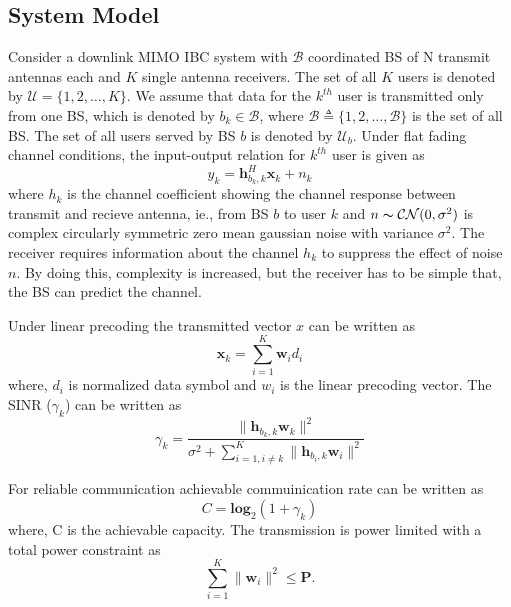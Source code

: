 \documentclass[a4paper, 12pt,titlepage]{dithesis} %
\newcommand{\me}[1]{\( #1 \)}
\begin{document}

\subsection{System Model}

Consider a downlink \ac{MIMO} \ac{IBC} system with \me{\mathcal {B}} coordinated \ac{BS} of N transmit antennas each and \me{K} single antenna receivers. The set of all \me{K} users is denoted by \me{\mathcal{U} = \{1,2,\dotsc, K\}}. We assume that data for the \me{k^{th}} user is transmitted only from one BS, which is denoted by \me{b_k \in \mathcal{B}}, where \me{\mathcal{B} \triangleq \{1,2,\dotsc, \mathcal{B}\}} is the set of all \ac{BS}. The set of all users served by BS \me{b} is denoted by \me{\mathcal{U}_b}. Under flat fading channel conditions, the input-output relation for \me{k^{th}} user is given as
\begin{equation}
y_k = \mathbf{h}_{b_k,k}^H \mathbf{x}_k  + {n}_k
\label{precoder1_eqn}
\end{equation}
where \me{h_k} is the channel coefficient showing the channel response between transmit and recieve antenna, ie., from \ac{BS} \me{b} to user \me{k} and \me{{n} \thicksim \mathcal{CN}(0,\sigma^{2})} is complex circularly symmetric zero mean gaussian noise with variance  \me{\sigma^2}. The receiver requires information about the channel \me{h_k} to suppress the effect of noise \me{n}. By doing this, complexity is increased, but the receiver has to be simple that, the \ac{BS} can predict the channel.

Under linear precoding the transmitted vector \me{x} can be written as
\begin{equation}
\mathbf{x}_k = \sum^K_{i=1} \mathbf{w}_i d_i
\label{precoder2_eqn}
\end{equation}
where, \me{d_i} is normalized data symbol and \me{w_i} is the linear precoding vector. The \ac{SINR} (\me{\gamma_k}) can be written as
\begin{equation}
\gamma_k = \frac{ \|\mathbf{h}_{b_k,k} \mathbf{w}_k\|^{2}}{\sigma^{2}+\sum_{i = 1, i \neq k}^{K} \|\mathbf{h}_{b_i,k} \mathbf{w}_{i}\|^{2}}
\label{precoder3_eqn}
\end{equation}

For reliable communication achievable commuinication rate can be written as
\begin{equation}
C = \mathbf{log}_2(1 + \gamma_k) 
\label{precoder4_eqn}
\end{equation}
where, C is the achievable capacity. The transmission is power limited with a total power constraint as
\begin{equation}
\sum_{i = 1}^{K} \|\mathbf{w}_i\|^2 \leq \mathbf{P}.
\label{precoder5_eqn}
\end{equation} 
\end{document}
